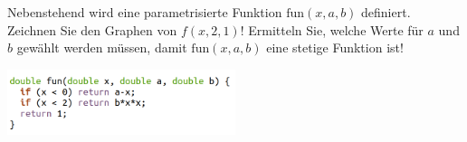 \item 

\begin{multicols}{2}

Nebenstehend wird eine parametrisierte Funktion $\text{fun}(x,a,b)$ definiert. Zeichnen Sie den Graphen von $f(x,2,1)$! Ermitteln Sie, welche Werte für $a$ und $b$ gewählt werden müssen, damit $\text{fun}(x,a,b)$ eine stetige Funktion ist!

\columnbreak

\includegraphics[width=0.5\textwidth]{../pool/ex-graph-draw-3-img-a.png}

\end{multicols}


